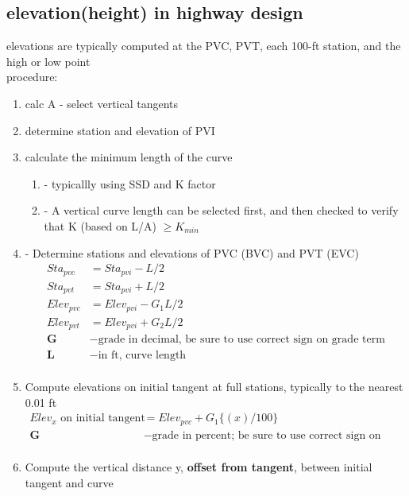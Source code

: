 \documentclass{article}
\begin{document}
  \subsection{elevation(height) in highway design}
    elevations are typically computed at the PVC, PVT, each 100-ft station, and the high or low point\\
    procedure: \\
    \begin{enumerate}
      \item calc A - select vertical tangents
      \item determine station and elevation of PVI 
      \item calculate the minimum length of the curve 
      \begin{enumerate}
        \item - typicallly using SSD and K factor
        \item - A vertical curve length can be selected first, and then checked to verify that K (based on L/A) $\geq K_{min}$
      \end{enumerate}
      \item - Determine stations and elevations of PVC (BVC) and PVT (EVC)
      \begin{align*}
        Sta_{pvc} & = Sta_{pvi} - L/2 \\
        Sta_{pvt} & = Sta_{pvi} + L/2  \\
        Elev_{pvc} & = Elev_{pvi} - G_1 L/2 \\
        Elev_{pvt} & = Elev_{pvi} + G_2 L/2  \\
        \textbf{G} & - \text{grade in decimal, be sure to use correct sign on grade term} \\
        \textbf{L} & - \text{in ft, curve length} \\
      \end{align*}
      \item Compute elevations on initial tangent at full stations, typically to the nearest 0.01 ft
      \begin{align*}
        Elev_x \text{ on initial tangent} & = Elev_{pvc} + G_1 \{(x)/100\} \\
        \textbf{G} & - \text{grade in percent; be sure to use correct sign on grade term} \\
      \end{align*}
      \item Compute the vertical distance y, \textbf{offset from tangent}, between initial tangent and curve
      \begin{align*}

\end{align*}
\end{enumerate}
\end{document}
